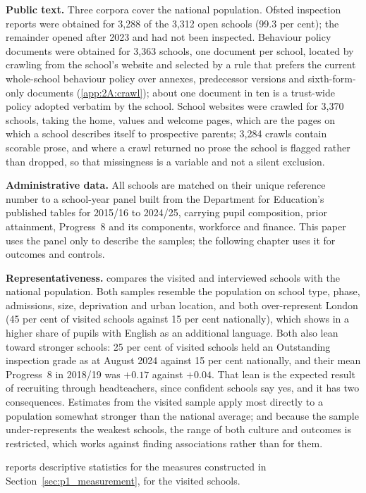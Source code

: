 \textbf{Public text.} Three corpora cover the national population. Ofsted
inspection reports were obtained for 3,288 of the 3,312 open schools
(99.3 per cent); the remainder opened after 2023 and had not been inspected.
Behaviour policy documents were obtained for 3,363 schools, one document per
school, located by crawling from the school's website and selected by a rule
that prefers the current whole-school behaviour policy over annexes,
predecessor versions and sixth-form-only documents (\cref{app:2A:crawl});
about one document in ten is a trust-wide policy adopted verbatim by the
school. School websites were crawled for 3,370 schools, taking the home,
values and welcome pages, which are the pages on which a school describes
itself to prospective parents; 3,284 crawls contain scorable prose, and where a
crawl returned no prose the school is flagged rather than dropped, so that
missingness is a variable and not a silent exclusion.

\textbf{Administrative data.} All schools are matched on their unique
reference number to a school-year panel built from the Department for
Education's published tables for 2015/16 to 2024/25, carrying pupil
composition, prior attainment, Progress~8 and its components, workforce and
finance. This paper uses the panel only to describe the samples; the
following chapter uses it for outcomes and controls.

\textbf{Representativeness.}  compares the
visited and interviewed schools with the national population. Both samples
resemble the population on school type, phase, admissions, size, deprivation
and urban location, and both over-represent London (45 per cent of visited
schools against 15 per cent nationally), which shows in a higher share of
pupils with English as an additional language. Both also lean toward stronger
schools: 25 per cent of visited schools held an Outstanding inspection grade
as at August 2024 against 15 per cent nationally, and their mean Progress~8
in 2018/19 was $+0.17$ against $+0.04$. That lean is the expected result of
recruiting through headteachers, since confident schools say yes, and it has
two consequences. Estimates from the visited sample apply most directly to a
population somewhat stronger than the national average; and because the
sample under-represents the weakest schools, the range of both culture and
outcomes is restricted, which works against finding associations rather than
for them.

 reports descriptive statistics for the measures
constructed in Section~\ref{sec:p1_measurement}, for the visited schools.

